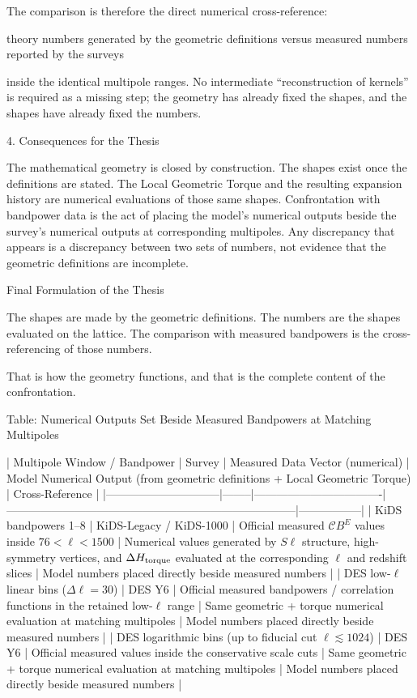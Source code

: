 The comparison is therefore the direct numerical cross-reference:

theory numbers generated by the geometric definitions  
  versus  
measured numbers reported by the surveys  

inside the identical multipole ranges. No intermediate “reconstruction of kernels” is required as a missing step; the geometry has already fixed the shapes, and the shapes have already fixed the numbers.

4. Consequences for the Thesis

The mathematical geometry is closed by construction. The shapes exist once the definitions are stated.
The Local Geometric Torque and the resulting expansion history are numerical evaluations of those same shapes.
Confrontation with bandpower data is the act of placing the model’s numerical outputs beside the survey’s numerical outputs at corresponding multipoles.
Any discrepancy that appears is a discrepancy between two sets of numbers, not evidence that the geometric definitions are incomplete.

Final Formulation of the Thesis

The shapes are made by the geometric definitions.  
The numbers are the shapes evaluated on the lattice.  
The comparison with measured bandpowers is the cross-referencing of those numbers.  

That is how the geometry functions, and that is the complete content of the confrontation.

Table: Numerical Outputs Set Beside Measured Bandpowers at Matching Multipoles

| Multipole Window / Bandpower | Survey | Measured Data Vector (numerical) | Model Numerical Output (from geometric definitions + Local Geometric Torque) | Cross-Reference |
|------------------------------|--------|----------------------------------|-----------------------------------------------------------------------------|-----------------|
| KiDS bandpowers 1–8         | KiDS-Legacy / KiDS-1000 | Official measured \(\mathcal{C}B^E\) values inside \(76 < \ell < 1500\) | Numerical values generated by \(S\ell\) structure, high-symmetry vertices, and \(\Delta H_{\rm torque}\) evaluated at the corresponding \(\ell\) and redshift slices | Model numbers placed directly beside measured numbers |
| DES low-\(\ell\) linear bins (\(\Delta\ell=30\)) | DES Y6 | Official measured bandpowers / correlation functions in the retained low-\(\ell\) range | Same geometric + torque numerical evaluation at matching multipoles | Model numbers placed directly beside measured numbers |
| DES logarithmic bins (up to fiducial cut \(\ell\lesssim1024\)) | DES Y6 | Official measured values inside the conservative scale cuts | Same geometric + torque numerical evaluation at matching multipoles | Model numbers placed directly beside measured numbers |

